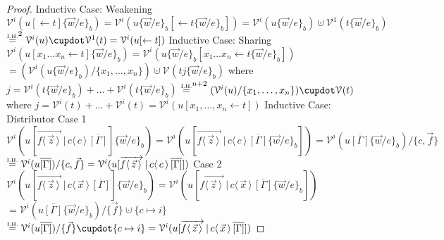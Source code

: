 \documentclass[a4paper,UKenglish,cleveref, autoref]{lipics-v2019}
\newcommand{\set}[1]{ \{ #1 \} }
\newcommand{\share}[3]{#1 [#2 \leftarrow #3]}
\newcommand{\dist}[5]{#1 [ #2 \, \vert \, \fakedist{#4}{#5} \, #3 ]}
\newcommand{\fakedist}[2]{#1 \langle \, #2 \, \rangle}
\newcommand{\vecdist}[2]{\overrightarrow{\fakedist{#1}{#2} \,}}
\newcommand{\psub}[3]{#1 \{ #2 / #3 \}_{b}}
\newcommand{\weightvar}[2]{\mathcal{V}^{#1}(#2)}
\newcommand{\IH}{\stackrel{\hbox{\tiny I.H.}}{\hbox{=}}}
\begin{document}
\begin{proof}
\newline
\newline
{ Inductive Case: Weakening}
\newline
$\weightvar{i}{\share{u}{}{t} \psub{}{\vec{w}}{e}} = \weightvar{i}{\share{u \psub{}{\vec{w}}{e}}{}{t \psub{}{\vec{w}}{e}}} = \weightvar{i}{u \psub{}{\vec{w}}{e}} \cupdot \weightvar{1}{t \psub{}{\vec{w}}{e}}$
\newline
$ \IH^{2} \weightvar{i}{u} \cupdot \weightvar{1}{t} = \weightvar{i}{\share{u}{}{t}}$
\newline
\newline
{ Inductive Case: Sharing}
\newline
$\weightvar{i}{\share{u}{x_{1} \dots x_{n}}{t} \psub{}{\vec{w}}{e}} = \weightvar{i}{\share{u \psub{}{\vec{w}}{e}}{x_{1} \dots x_{n}}{t \psub{}{\vec{w}}{e}}}$
\newline
$ = (\weightvar{i}{u \psub{}{\vec{w}}{e}} / \set{x_{1}, \dots, x_{n}}) \cupdot \weightvar{}{t \psub{j}{\vec{w}}{e}}$ where $j = \weightvar{i}{t \psub{}{\vec{w}}{e}} + \dots + \weightvar{i}{t \psub{}{\vec{w}}{e}}$
\newline
$\IH^{n + 2} (\weightvar{i}{u } / \set{x_{1}, \dots, x_{n}}) \cupdot \weightvar{}{t }$ where $j = \weightvar{i}{t} + \dots + \weightvar{i}{t} = \weightvar{i}{\share{u}{x_{1}, \dots, x_{n}}{t}}$
\newline
\newline
{ Inductive Case: Distributor}
\newline
Case 1
\newline
$\weightvar{i}{\dist{u}{\vecdist{f}{\vec{z}}}{\overline{[\Gamma]}}{c}{c} \psub{}{\vec{w}}{e}} = \weightvar{i}{\dist{u}{\vecdist{f}{\vec{z}}}{\overline{[\Gamma]} \psub{}{\vec{w}}{e} }{c}{c}} = \weightvar{i}{u \overline{[\Gamma]} \psub{}{\vec{w}}{e}} / \set{c, \vec{f}}$
\newline
$\IH  \weightvar{i}{u \overline{[\Gamma]}} / \set{c, \vec{f}} = \weightvar{i}{\dist{u}{\vecdist{f}{\vec{z}}}{\overline{[\Gamma]}}{c}{c}}$
\newline
Case 2
\newline
$\weightvar{i}{\dist{u}{\vecdist{f}{\vec{z}}}{\overline{[\Gamma]}}{c}{\vec{x}} \psub{}{\vec{w}}{e}} = \weightvar{i}{\dist{u}{\vecdist{f}{\vec{z}}}{\overline{[\Gamma]} \psub{}{\vec{w}}{e} }{c}{\vec{x}}}$
\newline
$ = \weightvar{i}{u \overline{[\Gamma]} \psub{}{\vec{w}}{e}} / \set{\vec{f}} \cupdot \set{c \mapsto i}$
\newline
$\IH  \weightvar{i}{u \overline{[\Gamma]}} / \set{\vec{f}} \cupdot \set{c \mapsto i} = \weightvar{i}{\dist{u}{\vecdist{f}{\vec{z}}}{\overline{[\Gamma]}}{c}{\vec{x}}}$

\end{proof}
\end{document}
